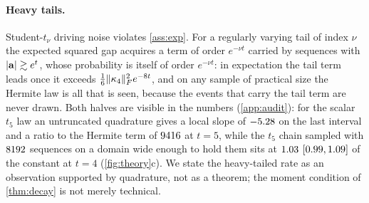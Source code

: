 \paragraph{Heavy tails.}
Student-$t_\nu$ driving noise violates \cref{ass:exp}. For a regularly varying tail of index
$\nu$ the expected squared gap acquires a term of order $e^{-\nu t}$ carried by
sequences with $|\mathbf{a}|\gtrsim e^{t}$, whose probability is itself of order $e^{-\nu t}$:
in expectation the tail term leads once it exceeds $\tfrac16\lVert \kappa_4 \rVert_{F}^2e^{-8t}$, and
on any sample of practical size the Hermite law is all that is seen, because the events
that carry the tail term are never drawn. Both halves are visible in the numbers
(\cref{app:audit}): for the scalar $t_5$ law an untruncated quadrature gives a local
slope of $-5.28$ on the last interval and a ratio to the Hermite
term of $9416$ at $t=5$, while the $t_5$ chain sampled with
$8192$ sequences on a domain wide enough to hold them sits at
$1.03$
$[0.99,1.09]$ of the constant at
$t=4$ (\cref{fig:theory}c). We state the heavy-tailed rate as an observation supported by
quadrature, not as a theorem; the moment condition of \cref{thm:decay} is not merely
technical.

